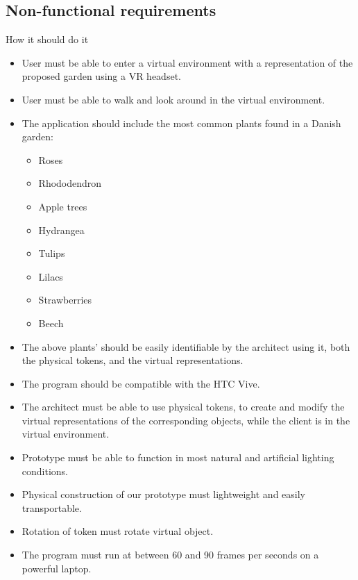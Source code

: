 				\subsection{Non-functional requirements}
					How it should do it\\
					\begin{itemize}
						\item User must be able to enter a virtual environment with a representation of the proposed garden using a VR headset.
						\item User must be able to walk and look around in the virtual environment.
						\item The application should include the most common plants found in a Danish garden:
						\begin{itemize}
							\item Roses
							\item Rhododendron
							\item Apple trees
							\item Hydrangea
							\item Tulips
							\item Lilacs
							\item Strawberries
							\item Beech
						\end{itemize}
						\item The above plants' should be easily identifiable by the architect using it, both the physical tokens, and the virtual representations.
						\item The program should be compatible with the HTC Vive.
						\item The architect must be able to use physical tokens, to create and modify the virtual representations of the corresponding objects, while the client is in the virtual environment.
						\item Prototype must be able to function in most natural and artificial lighting conditions.
						\item Physical construction of our prototype must lightweight and easily transportable. 
						\item Rotation of token must rotate virtual object.
						\item The program must run at between 60 and 90 frames per seconds on a powerful laptop.

\end{itemize}
